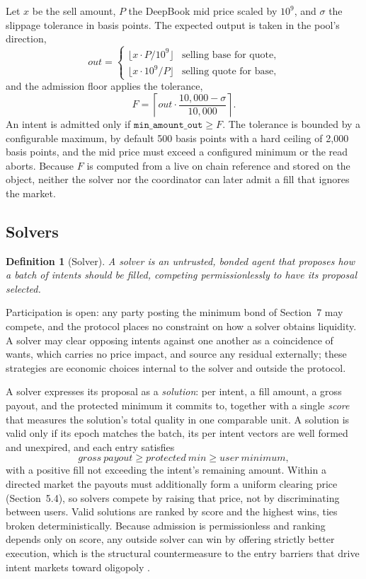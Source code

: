 \documentclass[10pt,sigconf,nonacm]{acmart}
\theoremstyle{reiythm}
\newtheorem{definition}{Definition}
\begin{document}
\noindent Let $x$ be the sell amount, $P$ the DeepBook mid price
\cite{querypoolsui} scaled by $10^9$, and $\sigma$ the slippage tolerance in basis
points. The expected output is taken in the pool's direction,
\[
  \mathit{out} =
  \begin{cases}
    \lfloor x \cdot P / 10^9 \rfloor & \text{selling base for quote,}\\[2pt]
    \lfloor x \cdot 10^9 / P \rfloor & \text{selling quote for base,}
  \end{cases}
\]
and the admission floor applies the tolerance,
\[
  F = \left\lceil \mathit{out} \cdot \frac{10{,}000 - \sigma}{10{,}000} \right\rceil .
\]
An intent is admitted only if $\texttt{min\_amount\_out} \ge F$. The tolerance is
bounded by a configurable maximum, by default 500 basis points with a hard ceiling
of 2{,}000 basis points, and the mid price must exceed a configured minimum or the
read aborts. Because $F$ is computed from a live on chain reference and stored on
the object, neither the solver nor the coordinator can later admit a fill that
ignores the market.

\subsection{Solvers}

\begin{definition}[Solver]
A solver is an untrusted, bonded agent that proposes how a batch of intents should
be filled, competing permissionlessly to have its proposal selected.
\end{definition}

\noindent Participation is open: any party posting the minimum bond of Section~7
may compete, and the protocol places no constraint on how a solver obtains
liquidity. A solver may clear opposing intents against one another
as a coincidence of wants, which carries no price impact, and source any residual
externally; these strategies are economic choices internal to the solver and
outside the protocol.

A solver expresses its proposal as a \emph{solution}: per intent, a fill amount, a
gross payout, and the protected minimum it commits to, together with a single
\emph{score} that measures the solution's total quality in one comparable unit. A
solution is valid only if its epoch matches the batch, its per intent vectors are
well formed and unexpired, and each entry satisfies
\[
  \mathit{gross\ payout} \ge \mathit{protected\ min} \ge \mathit{user\ minimum},
\]
with a positive fill not exceeding the intent's remaining amount. Within a directed
market the payouts must additionally form a uniform clearing price (Section~5.4),
so solvers compete by raising that price, not by discriminating between users. Valid
solutions are ranked by score and the highest wins, ties broken deterministically.
Because admission is permissionless and ranking depends only on score, any outside
solver can win by offering strictly better execution, which is the structural
countermeasure to the entry barriers that drive intent markets toward oligopoly
\cite{chitra2024analysisintentbasedmarkets}.
\end{document}
